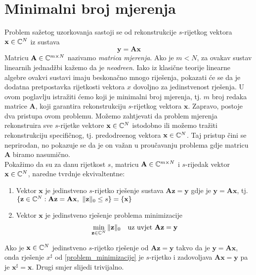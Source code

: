 \documentclass[a4paper,twoside,12pt]{memoir} %
\newcommand{\vect}[1]{\mathbf{#1}}
\newcommand{\norm}[1]{\|{#1}\|}
\begin{document}
\section[Minimalni broj mjerenja][Minimalni broj mjerenja]{Minimalni broj mjerenja}
Problem sa\v{z}etog uzorkovanja sastoji se od rekonstrukcije $s$-rijetkog vektora $\vect{x} \in \C^N$ iz sustava
$$\vect{y} = \vect{A}\vect{x}$$
Matricu $\vect{A} \in \C^{m\times N}$ nazivamo \textit{matrica mjerenja}. Ako je $m < N$, za ovakav sustav linearnih jednad\v{z}bi ka\v{z}emo da je \textit{neodre\dj en}. Iako iz klasi\v{c}ne teorije linearne algebre ovakvi sustavi imaju beskona\v{c}no mnogo rije\v{s}enja, pokazati \'ce se da je dodatna pretpostavka rijetkosti vektora $x$ dovoljno za jedinstvenost rje\v{s}enja. U ovom poglavlju istra\v{z}iti \'cemo koji je minimalni broj mjerenja, tj. $m$ broj redaka matrice $\vect{A}$, koji garantira rekonstrukciju $s$-rijetkog vektora $\vect{x}$. Zapravo, postoje dva pristupa ovom problemu. Mo\v{z}emo zahtjevati da problem mjerenja rekonstruira sve $s$-rijetke vektore $\vect{x} \in \C^N$ istodobno ili mo\v{z}emo tra\v{z}iti rekonstrukciju specifi\v{c}nog, tj. predodre\dj enog vektora $\vect{x} \in \C^N$. Taj pristup \v{c}ini se neprirodan, no pokazuje se da je on va\v{z}an u prou\v{c}avanju problema gdje matricu $\vect{A}$ biramo nasumi\v{c}no. \\ 
\indent Poka\v{z}imo da su za danu rijetkost $s$, matricu $\vect{A} \in \C^{m \times N}$ i $s$-rijedak vektor $\vect{x} \in \C^N$, naredne tvrdnje ekvivaltentne: 
\begin{enumerate}
    \item Vektor $\vect{x}$ je jedinstveno $s$-rijetko rje\v{s}enje sustava $\vect{A}\vect{z}=\vect{y}$ gdje je $\vect{y} = \vect{Ax}$, tj. $\{\vect{z} \in \C^N : \vect{A}\vect{z}= \vect{A}\vect{x},\ \norm{\vect{z}}_0 \leq s\} = \{\vect{x}\}$
    \item Vektor $\vect{x}$ je jedinstveno rje\v{s}enje problema minimizacije
        \begin{equation}
            \min\limits_{\vect{z} \in \C^N} \norm{\vect{z}}_0\quad \text{uz uvjet}\ \vect{Az} = \vect y \label{problem_minimizacije} 
        \end{equation}
\end{enumerate}
Ako je $\vect{x} \in \C^N$ jedinstveno $s$-rijetko rje\v{s}enje od $\vect{Az} = \vect y$ takvo da je $\vect y = \vect{Ax}$, onda rje\v{s}enje $x^{\sharp}$ od \eqref{problem_minimizacije} je $s$-rijetko i zadovoljava $\vect{Ax} = \vect y$ pa je $\vect x^\sharp = \vect x$. Drugi smjer slijedi trivijalno.
\end{document}
